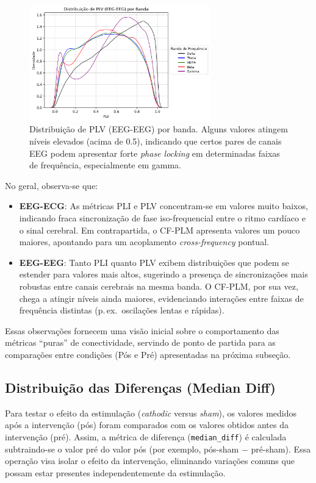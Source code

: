 \begin{figure}[htb]
    \centering
    \includegraphics[width=0.7\textwidth]{figs/3_1_connectivity_metrics/Distribuição_de_PLV_(EEG-EEG)_por_Banda.png}
    \caption{Distribuição de PLV (EEG-EEG) por banda. Alguns valores atingem níveis elevados (acima de 0.5), indicando que certos pares de canais EEG podem apresentar forte \emph{phase locking} em determinadas faixas de frequência, especialmente em gamma.}
    \label{fig:plv_eeg_eeg}
\end{figure}

No geral, observa-se que:
\begin{itemize}
    \item \textbf{EEG-ECG}: As métricas PLI e PLV concentram-se em valores muito baixos, indicando fraca sincronização de fase iso-frequencial entre o ritmo cardíaco e o sinal cerebral. Em contrapartida, o CF-PLM apresenta valores um pouco maiores, apontando para um acoplamento \emph{cross-frequency} pontual.
    \item \textbf{EEG-EEG}: Tanto PLI quanto PLV exibem distribuições que podem se estender para valores mais altos, sugerindo a presença de sincronizações mais robustas entre canais cerebrais na mesma banda. O CF-PLM, por sua vez, chega a atingir níveis ainda maiores, evidenciando interações entre faixas de frequência distintas (p.\,ex.\ oscilações lentas e rápidas).
\end{itemize}

Essas observações fornecem uma visão inicial sobre o comportamento das métricas “puras” de conectividade, servindo de ponto de partida para as comparações entre condições (Pós e Pré) apresentadas na próxima subseção.

\subsection{Distribuição das Diferenças (Median Diff)}
Para testar o efeito da estimulação (\emph{cathodic} versus \emph{sham}), os valores medidos após a intervenção (pós) foram comparados com os valores obtidos antes da intervenção (pré). Assim, a métrica de diferença (\texttt{median\_diff}) é calculada subtraindo-se o valor pré do valor pós (por exemplo, pós-sham $-$ pré-sham). Essa operação visa isolar o efeito da intervenção, eliminando variações comuns que possam estar presentes independentemente da estimulação.

